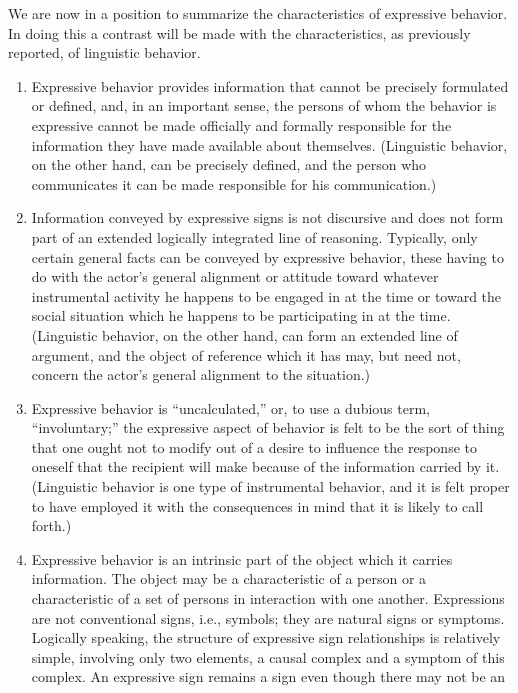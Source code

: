 \documentclass[openany,nobib]{tufte-book}
\begin{document}
We are now in a position to summarize the characteristics of expressive
behavior. In doing this a contrast will be made with the
characteristics, as previously reported, of linguistic behavior.

\begin{enumerate}
\item
  Expressive behavior provides information that cannot be precisely
  formulated or defined, and, in an important sense, the persons of whom
  the behavior is expressive cannot be made officially and formally
  responsible for the information they have made available about
  themselves. (Linguistic behavior, on the other hand, can be precisely
  defined, and the person who communicates it can be made responsible
  for his communication.)
\item
  Information conveyed by expressive signs is not discursive and does
  not form part of an extended logically integrated line of reasoning.
  Typically, only certain general facts can be conveyed by expressive
  behavior, these having to do with the actor's general alignment or
  attitude toward whatever instrumental activity he happens to be
  engaged in at the time or toward the social situation which he happens
  to be participating in at the time. (Linguistic behavior, on the other
  hand, can form an extended line of argument, and the object of
  reference which it has may, but need not, concern the actor's general
  alignment to the situation.)
\item
  Expressive behavior is ``uncalculated,'' or, to use a dubious term,
  ``involuntary;'' the expressive aspect of behavior is felt to be the
  sort of thing that one ought not to modify out of a desire to
  influence the response to oneself that the recipient will make because
  of the information carried by it. (Linguistic behavior is one type of
  instrumental behavior, and it is felt proper to have employed it with
  the consequences in mind that it is likely to call forth.)
\item
  Expressive behavior is an intrinsic part of the object which it
  carries information. The object may be a characteristic of a person or
  a characteristic of a set of persons in interaction with one another.
  Expressions are not conventional signs, i.e., symbols; they are
  natural signs or symptoms. Logically speaking, the structure of
  expressive sign relationships is relatively simple, involving only two
  elements, a causal complex and a symptom of this complex. An
  expressive sign remains a sign even though there may not be an

\end{enumerate}
\end{document}
